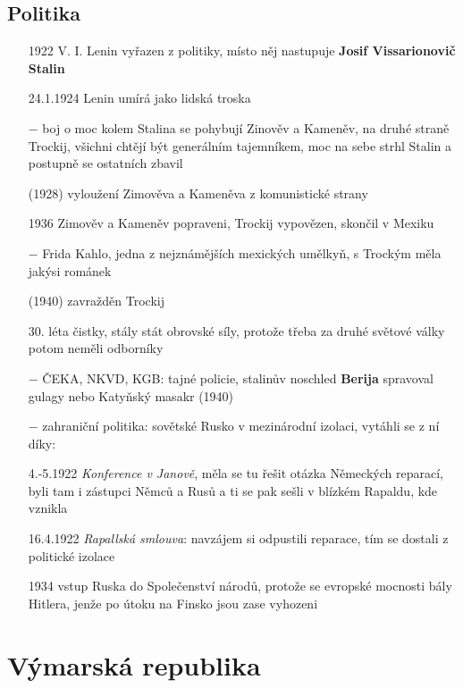 \documentclass{article}
\begin{document}
\subsection*{Politika}
\begin{itemize}
    \vspace{-0.5em}
    \setlength\itemsep{0.15em}
    \item[1922] V. I. Lenin vyřazen z politiky, místo něj nastupuje \textbf{Josif Vissarionovič Stalin}
    \item[24.1.1924] Lenin umírá jako lidská troska
    \item[$-$] boj o moc kolem Stalina se pohybují Zinověv a Kameněv, na druhé straně Trockij, všichni chtějí být generálním tajemníkem, moc na sebe strhl Stalin a postupně se ostatních zbavil
    \item[(1928)] vyloužení Zimověva a Kameněva z komunistické strany
    \item[1936] Zimověv a Kameněv popraveni, Trockij vypovězen, skončil v Mexiku
    \item[$-$] Frida Kahlo, jedna z nejznámějších mexických umělkyň, s Trockým měla jakýsi románek
    \item[(1940)] zavražděn Trockij
    \item[30. léta] čistky, stály stát obrovské síly, protože třeba za druhé světové války potom neměli odborníky
    \item[$-$] ČEKA, NKVD, KGB: tajné policie, stalinův noschled \textbf{Berija} spravoval gulagy nebo Katyňský masakr (1940)
    \item[$-$] zahraniční politika: sovětské Rusko v mezinárodní izolaci, vytáhli se z ní díky:
    \item[4.-5.1922] \textit{Konference v Janově}, měla se tu řešit otázka Německých reparací, byli tam i zástupci Němců a Rusů a ti se pak sešli v blízkém Rapaldu, kde vznikla
    \item[16.4.1922] \textit{Rapallská smlouva}: navzájem si odpustili reparace, tím se dostali z politické izolace
    \item[1934] vstup Ruska do Společenství národů, protože se evropské mocnosti bály Hitlera, jenže po útoku na Finsko jsou zase vyhozeni
\end{itemize}


\section*{Výmarská republika}
\end{document}
